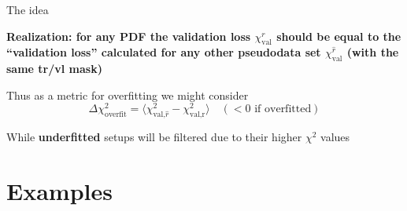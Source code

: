 \documentclass[aspectratio=169,11pt]{beamer}
\begin{document}
\begin{frame}[t]{The idea}

  \textbf{Realization: for any PDF the validation loss $\chi^{r}_\text{val}$ should be equal to the ``validation loss'' calculated for any other pseudodata set  $\chi^{\hat{r}}_\text{val}$ (with the same tr/vl mask)}\\\vspace*{1em}


  Thus as a metric for overfitting we might consider
  $$
  \Delta\chi^2_{\text{overfit}}=\langle \chi^{2}_\text{val,$\hat{r}$} - \chi^{2}_\text {val,r}\rangle\quad (<0 \text{ if overfitted})
  $$


  While \textbf{underfitted} setups will be filtered due to their higher $\chi^2$ values 

\end{frame}


\section*{Examples}
\end{document}
